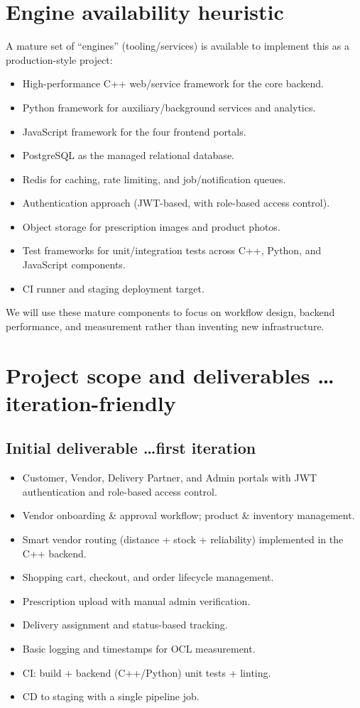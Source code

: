 \documentclass{article}
\begin{document}
\section{Engine availability heuristic}
A mature set of ``engines'' (tooling/services) is available to implement this as a
production-style project:
\begin{itemize}
    \item High-performance C++ web/service framework for the core backend.
    \item Python framework for auxiliary/background services and analytics.
    \item JavaScript framework for the four frontend portals.
    \item PostgreSQL as the managed relational database.
    \item Redis for caching, rate limiting, and job/notification queues.
    \item Authentication approach (JWT-based, with role-based access control).
    \item Object storage for prescription images and product photos.
    \item Test frameworks for unit/integration tests across C++, Python, and JavaScript
    components.
    \item CI runner and staging deployment target.
\end{itemize}
We will use these mature components to focus on workflow design, backend performance, and
measurement rather than inventing new infrastructure.

\section{Project scope and deliverables \dots iteration-friendly}

\subsection{Initial deliverable \dots first iteration}
\begin{itemize}
    \item Customer, Vendor, Delivery Partner, and Admin portals with JWT authentication and
    role-based access control.
    \item Vendor onboarding \& approval workflow; product \& inventory management.
    \item Smart vendor routing (distance + stock + reliability) implemented in the C++ backend.
    \item Shopping cart, checkout, and order lifecycle management.
    \item Prescription upload with manual admin verification.
    \item Delivery assignment and status-based tracking.
    \item Basic logging and timestamps for OCL measurement.
    \item CI: build + backend (C++/Python) unit tests + linting.
    \item CD to staging with a single pipeline job.
\end{itemize}
\end{document}
